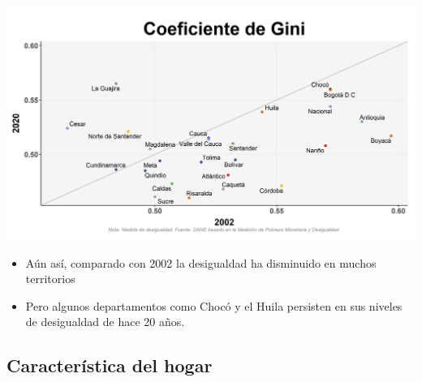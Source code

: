 \documentclass[aspectratio=169]{beamer}
\begin{document}
    \begin{slide}{5} 
                      \begin{imagecolumn}
                \includegraphics[width=\columnwidth]{img/var_254_scatter_time.png}
            \end{imagecolumn}
            \begin{textcolumn}
                \begin{itemize}
                    \item Aún así, comparado con 2002 la desigualdad ha disminuido en muchos territorios
                    \item Pero algunos departamentos como Chocó y el Huila persisten en sus niveles de desigualdad de hace 20 años.
                \end{itemize}
            \end{textcolumn}

    \printcolumns
    \end{slide}
     
    

    
    \subsection{Característica del hogar}
    
\end{document}
